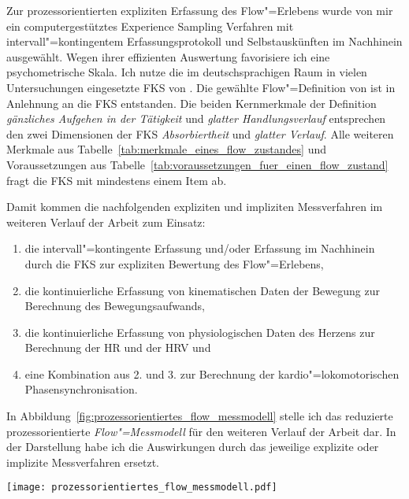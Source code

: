 Zur prozessorientierten expliziten Erfassung des Flow"=Erlebens wurde von mir ein computergestütztes Experience Sampling Verfahren mit intervall"=kontingentem Erfassungsprotokoll und Selbstauskünften im Nachhinein ausgewählt. Wegen ihrer effizienten Auswertung favorisiere ich eine psychometrische Skala. Ich nutze die im deutschsprachigen Raum in vielen Untersuchungen eingesetzte \ac{FKS} von \citet{Rheinberg2003}. Die gewählte Flow"=Definition von \citet{Henk2014} ist in Anlehnung an die \ac{FKS} entstanden. Die beiden Kernmerkmale der Definition \emph{gänzliches Aufgehen in der Tätigkeit} und \emph{glatter Handlungsverlauf} entsprechen den zwei Dimensionen der \ac{FKS} \emph{Absorbiertheit} und \emph{glatter Verlauf}. Alle weiteren Merkmale aus Tabelle~\ref{tab:merkmale_eines_flow_zustandes} und Voraussetzungen aus Tabelle~\ref{tab:voraussetzungen_fuer_einen_flow_zustand} fragt die \ac{FKS} mit mindestens einem Item ab. 

Damit kommen die nachfolgenden expliziten und impliziten Messverfahren im weiteren Verlauf der Arbeit zum Einsatz:
\begin{enumerate}
	
	\item die intervall"=kontingente Erfassung und/oder Erfassung im Nachhinein durch die \ac{FKS} zur expliziten Bewertung des Flow"=Erlebens,

	\item die kontinuierliche Erfassung von kinematischen Daten der Bewegung zur Berechnung des Bewegungsaufwands, 

	\item die kontinuierliche Erfassung von physiologischen Daten des Herzens zur Berechnung der \ac{HR} und der \ac{HRV} und

	\item eine Kombination aus 2. und 3. zur Berechnung der kardio"=lokomotorischen Phasensynchronisation.
\end{enumerate}

In Abbildung~\ref{fig:prozessorientiertes_flow_messmodell} stelle ich das reduzierte prozessorientierte \emph{Flow"=Messmodell} für den weiteren Verlauf der Arbeit dar. In der Darstellung habe ich die Auswirkungen durch das jeweilige explizite oder implizite Messverfahren ersetzt. 
\begin{sidewaysfigure}
	\texttt{[image: prozessorientiertes\_flow\_messmodell.pdf]} \caption[Das prozessorientierte Flow"=Messmodell für die Entwicklung eines impliziten Messverfahrens des Flow"=Erlebens]{Das prozessorientierte Flow"=Messmodell für die Entwicklung eines impliziten Messverfahrens des Flow"=Erlebens -- die Auswirkungen wurden durch das jeweilige explizite oder implizite Messverfahren ersetzt. Die explizite Befragung durch die \ac{FKS} findet nicht mehr im Prozess statt.} \label{fig:prozessorientiertes_flow_messmodell} 
\end{sidewaysfigure}

